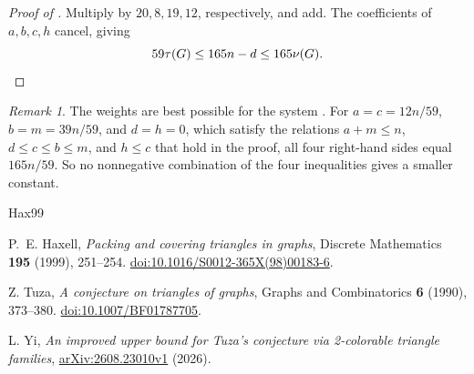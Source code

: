 \documentclass[11pt]{article}
\theoremstyle{remark}
\newtheorem*{remark}{Remark}
\begin{document}
\begin{proof}[Proof of ]
Multiply  by $20,8,19,12$, respectively, and add. The coefficients of $a,b,c,h$ cancel, giving
\[
 59\tau(G)\le165n-d\le165\nu(G).\qedhere
\]
\end{proof}

\begin{remark}
The weights are best possible for the system . For $a=c=12n/59$, $b=m=39n/59$, and $d=h=0$, which satisfy the relations $a+m\le n$, $d\le c\le b\le m$, and $h\le c$ that hold in the proof, all four right-hand sides equal $165n/59$. So no nonnegative combination of the four inequalities gives a smaller constant.
\end{remark}

\begin{thebibliography}{Hax99}
\raggedright
{}
P.\ E. Haxell, \emph{Packing and covering triangles in graphs},
Discrete Mathematics \textbf{195} (1999), 251--254.
\href{https://doi.org/10.1016/S0012-365X(98)00183-6}{doi:10.1016/S0012-365X(98)00183-6}.

Z. Tuza, \emph{A conjecture on triangles of graphs},
Graphs and Combinatorics \textbf{6} (1990), 373--380.
\href{https://doi.org/10.1007/BF01787705}{doi:10.1007/BF01787705}.

L. Yi, \emph{An improved upper bound for Tuza's conjecture via 2-colorable triangle families},
\href{https://arxiv.org/abs/2608.23010v1}{arXiv:2608.23010v1} (2026).
\end{thebibliography}
\end{document}
